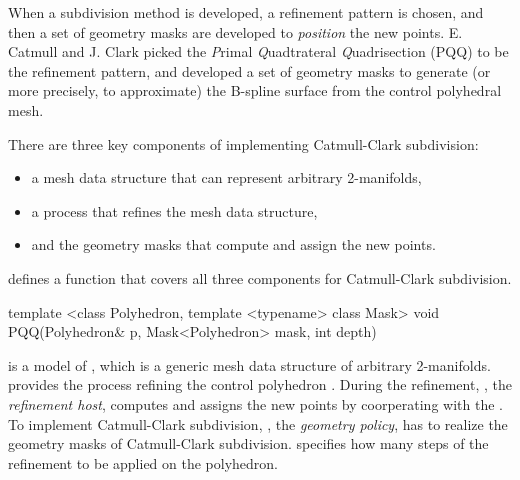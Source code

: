 When a subdivision method is developed, a refinement pattern is 
chosen, and then a set of geometry masks are developed to 
\emph{position} the new points.
E. Catmull and J. Clark picked the \emph{P}rimal \emph{Q}uadtrateral 
\emph{Q}uadrisection (PQQ) to be the refinement pattern,
and developed a set of geometry masks to generate (or more precisely, 
to approximate) the B-spline surface from the control polyhedral 
mesh. 

There are three key components of implementing
Catmull-Clark subdivision: 
\begin{itemize}
\item
a mesh data structure that can represent arbitrary 2-manifolds, 
\item
a process that refines the mesh data structure, 
\item
and the geometry masks that compute and assign the new points.
\end{itemize}

 defines a function that covers all 
three components for Catmull-Clark subdivision.

\begin{ccExampleCode}
template <class Polyhedron, template <typename> class Mask>
void PQQ(Polyhedron& p, Mask<Polyhedron> mask, int depth)
\end{ccExampleCode}

 is a model of , which
is a generic mesh data structure of arbitrary 
2-manifolds.  provides the process refining 
the control polyhedron . During the refinement, 
, the \emph{refinement host}, computes and assigns the 
new points by coorperating with the . 
To implement Catmull-Clark subdivision,
, the \emph{geometry policy}, has to realize the geometry 
masks of Catmull-Clark subdivision. 
 specifies how many steps of the refinement 
to be applied on the polyhedron. 

